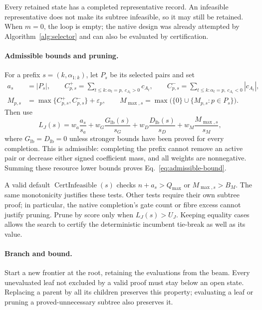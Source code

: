 \documentclass[a4paper,onecolumn,11pt,unpublished]{quantumarticle}
\theoremstyle{remark}
\begin{document}
Every retained state has a completed representative record.  An infeasible
representative does not make its subtree infeasible, so it may still be
retained.  When $m=0$, the loop is empty; the native design was already
attempted by Algorithm~\ref{alg:selector} and can also be evaluated by certification.

\paragraph{Admissible bounds and pruning.}
For a prefix $s=(k,\alpha_{1:k})$, let $P_s$ be its selected pairs and set
\begin{align}
a_s&=|P_s|,\qquad
C^+_{p,s}=\sum_{t\leq k:\alpha_t=p,\ c_{A_t}>0}c_{A_t},\qquad
C^-_{p,s}=\sum_{t\leq k:\alpha_t=p,\ c_{A_t}<0}|c_{A_t}|,
\label{eq:app-signed-masses}\\
M_{p,s}&=\max\{C^+_{p,s},C^-_{p,s}\}+\varepsilon_p,\qquad
M_{\max,s}=\max\bigl(\{0\}\cup\{M_{p,s}:p\in P_s\}\bigr).
\label{eq:app-partial-penalties}
\end{align}
Then use
\begin{equation}
L_J(s)=w_a\frac{a_s}{s_a}
+w_G\frac{G_{\mathrm{lb}}(s)}{s_G}
+w_D\frac{D_{\mathrm{lb}}(s)}{s_D}
+w_M\frac{M_{\max,s}}{s_M},
\label{eq:app-certified-node-bound}
\end{equation}
where $G_{\mathrm{lb}}=D_{\mathrm{lb}}=0$ unless stronger bounds have been proved
for every completion.  This is admissible: completing the prefix cannot
remove an active pair or decrease either signed coefficient mass, and all
weights are nonnegative.  Summing these resource lower bounds proves
Eq.~\eqref{eq:admissible-bound}.

A valid default $\operatorname{CertInfeasible}(s)$ checks
$n+a_s>Q_{\max}$ or $M_{\max,s}>B_M$.  The same monotonicity justifies these
tests.  Other tests require their own subtree proof; in particular, the
native completion's gate count or fibre excess cannot justify pruning.
Prune by score only when $L_J(s)>U_J$.  Keeping equality cases allows the
search to certify the deterministic incumbent tie-break as well as its value.

\paragraph{Branch and bound.}
Start a new frontier at the root, retaining the evaluations from the beam.
Every unevaluated leaf not excluded by a valid proof must stay below an open
state.  Replacing a parent by all its children preserves this property;
evaluating a leaf or pruning a proved-unnecessary subtree also preserves it.
\end{document}
